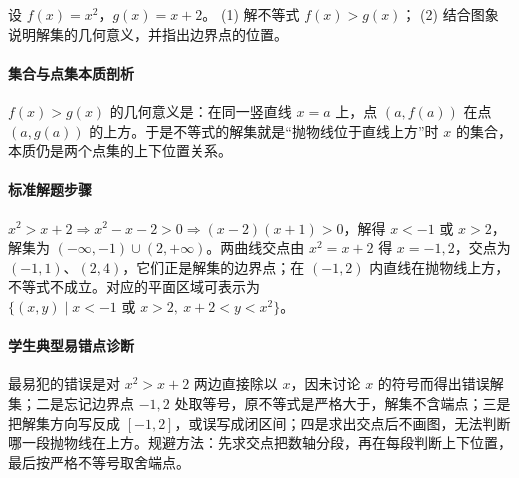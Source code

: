 \begin{problem}
设 $f(x)=x^2$，$g(x)=x+2$。
(1) 解不等式 $f(x)>g(x)$；
(2) 结合图象说明解集的几何意义，并指出边界点的位置。
\end{problem}
\begin{solution}
\paragraph{集合与点集本质剖析}
$f(x)>g(x)$ 的几何意义是：在同一竖直线 $x=a$ 上，点 $(a,f(a))$ 在点 $(a,g(a))$ 的上方。于是不等式的解集就是“抛物线位于直线上方”时 $x$ 的集合，本质仍是两个点集的上下位置关系。
\paragraph{标准解题步骤}
$x^2>x+2\Rightarrow x^2-x-2>0\Rightarrow (x-2)(x+1)>0$，解得 $x<-1$ 或 $x>2$，解集为 $(-\infty,-1)\cup(2,+\infty)$。两曲线交点由 $x^2=x+2$ 得 $x=-1,2$，交点为 $(-1,1)$、$(2,4)$，它们正是解集的边界点；在 $(-1,2)$ 内直线在抛物线上方，不等式不成立。对应的平面区域可表示为 $\{(x,y)\mid x<-1\text{ 或 }x>2,\ x+2<y<x^2\}$。
\paragraph{学生典型易错点诊断}
最易犯的错误是对 $x^2>x+2$ 两边直接除以 $x$，因未讨论 $x$ 的符号而得出错误解集；二是忘记边界点 $-1,2$ 处取等号，原不等式是严格大于，解集不含端点；三是把解集方向写反成 $[-1,2]$，或误写成闭区间；四是求出交点后不画图，无法判断哪一段抛物线在上方。规避方法：先求交点把数轴分段，再在每段判断上下位置，最后按严格不等号取舍端点。
\end{solution}

